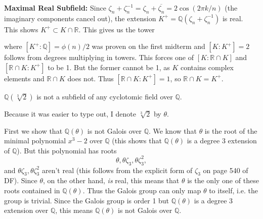 \documentclass[10pt]{report}
\begin{document}
\textbf{Maximal Real Subfield:} Since $\zeta_{n}+\zeta_{n}^{-1} = \zeta_{n}+\overline{\zeta_{n}}= 2\cos(2\pi k /n)$ (the imaginary components cancel out), the extension $K^{+} = \mathbb{Q}(\zeta_{n}+\zeta_{n}^{-1})$ is real. This shows $K^{+}\subset K \cap\mathbb{R}$. This gives us the tower
\begin{figure}[H]
	\centering
{}
\end{figure}
where $[K^{+}:\mathbb{Q}]=\phi(n)/2$ was proven on the first midterm and $[K:K^{+}]=2$ follows from degrees multiplying in towers. This forces one of $[K:\mathbb{R}\cap K]$ and $[\mathbb{R}\cap K:K^{+}]$ to be 1. But the former cannot be 1, as $K$ contains complex elements and $\mathbb{R} \cap K$ does not. Thus $[\mathbb{R}\cap K:K^{+}]=1$, so $\mathbb{R}\cap K = K^{+}$.

\pagebreak
\begin{exer}[14.5: 10]
	$\mathbb{Q}(\sqrt[3]{2} )$ is not a subfield of any cyclotomic field over $\mathbb{Q}$.
\end{exer}
Because it was easier to type out, I denote $\sqrt[3]{2} $ by $\theta$.

First we show that $\mathbb{Q}(\theta)$ is not Galois over $\mathbb{Q}$. We know that $\theta$ is the root of the minimal polynomial $x^3-2$ over $\mathbb{Q}$ (this shows that $\mathbb{Q}(\theta)$ is a degree 3 extension of $\mathbb{Q}$). But this polynomial has roots
\[
\theta, \theta\zeta_3,\theta\zeta_3^2,
\] and $\theta\zeta_3,\theta\zeta_3^2$ aren't real (this follows from the explicit form of $\zeta_3$ on page 540 of DF). Since $\theta$, on the other hand, \textit{is} real, this means that $\theta$ is the only one of these roots contained in $\mathbb{Q}(\theta)$. Thus the Galois group can only map $\theta$ to itself, i.e. the group is trivial. Since the Galois group is order 1 but  $\mathbb{Q}(\theta)$ is a degree 3 extension over $\mathbb{Q}$, this means $\mathbb{Q}(\theta)$ is not Galois over $\mathbb{Q}$.
\end{document}
